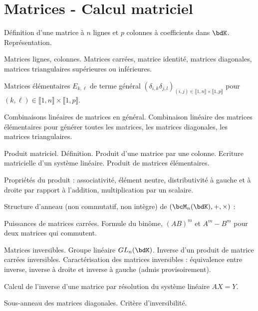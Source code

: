 \documentclass[a4paper,french,bookmarks]{article}
\begin{document}

\section*{Matrices - Calcul matriciel}

\begin{enumerate}
    \ithand Définition d’une matrice à $n$ lignes et $p$ colonnes à coefficients dans $\bdK$. Représentation.
    
    \ithand Matrices lignes, colonnes. Matrices carrées, matrice identité, matrices diagonales, matrices triangulaires supérieures ou inférieures.
    
    \ithand Matrices élémentaires $E_{k, \ell}$ de terme général $(\delta_{i, k}\delta_{j, l})_{(i, j) \in \llbracket 1, n\rrbracket \times \llbracket 1, p\rrbracket}$ pour $(k, \ell) \in \llbracket 1, n\rrbracket \times \llbracket 1, p\rrbracket$.
    
    \ithand Combinaisons linéaires de matrices en général. Combinaison linéaire des matrices élémentaires pour générer toutes les matrices, les matrices diagonales, les matrices triangulaires.
    
    \ithand Produit matriciel. Définition. Produit d’une matrice par une colonne. Ecriture matricielle d’un système linéaire. Produit de matrices élémentaires.
    
    \ithand  Propriétés du produit : associativité, élément neutre, distributivité à gauche et à droite par rapport à l’addition, multiplication par un scalaire.
    
    \ithand Structure d’anneau (non commutatif, non intègre) de $(\bcM_n(\bdK), +, \times)$ :
    
    \begin{enumerate}
        \itstar Puissances de matrices carrées. Formule du binôme, $(AB)^m$ et $A^m - B^m$ pour deux matrices qui commutent.
        
        \itstar Matrices inversibles. Groupe linéaire $GL_n(\bdK)$. Inverse d’un produit de matrice carrées inversibles. Caractérisation des matrices inversibles : équivalence entre inverse, inverse à droite et inverse à gauche (admis provisoirement).
        
        \itstar Calcul de l’inverse d’une matrice par résolution du système linéaire $AX = Y$.
        
        \itstar Sous-anneau des matrices diagonales. Critère d’inversibilité.
        

\end{enumerate}
\end{enumerate}
\end{document}
